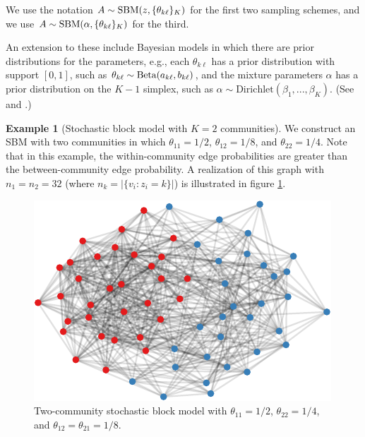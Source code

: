 \documentclass[
  12pt,
]{article}
\theoremstyle{definition}
\theoremstyle{definition}
\newtheorem{example}{Example}[section]
\theoremstyle{definition}
\theoremstyle{definition}
\theoremstyle{remark}
\begin{document}
We use the notation \(A \sim \mathrm{SBM}(z, \{\theta_{k \ell}\}_K)\) for the first two sampling schemes, and we use \(A \sim \mathrm{SBM}(\alpha, \{\theta_{k \ell}\}_K)\) for the third.

An extension to these include Bayesian models in which there are prior distributions for the parameters, e.g., each \(\theta_{k \ell}\) has a prior distribution with support \([0, 1]\), such as \(\theta_{k \ell} \sim \mathrm{Beta}(a_{k \ell}, b_{k \ell})\), and the mixture parameters \(\alpha\) has a prior distribution on the \(K-1\) simplex, such as \(\alpha \sim \mathrm{Dirichlet}(\beta_1, ..., \beta_K)\).
(See \citet{RePEc:eee:csdana:v:60:y:2013:i:c:p:12-31} and \citet{10.2307/43974715}.)

\begin{example}[Stochastic block model with $K = 2$ communities]
\label{ex:assort-sbm}
We construct an SBM with two communities in which $\theta_{11} = 1/2$, $\theta_{12} = 1/8$, and $\theta_{22} = 1/4$. 
Note that in this example, the within-community edge probabilities are greater than the between-community edge probability. 
A realization of this graph with $n_1 = n_2 = 32$ (where $n_k = |\{v_i : z_i = k\}|$) is illustrated in figure \ref{fig:assort-sbm}.

\begin{figure}[H]

{\centering \includegraphics{draft_files/figure-latex/assort-sbm-1} 

}

\caption{Two-community stochastic block model with $\theta_{11}=1/2$, $\theta_{22}=1/4$, and $\theta_{12} = \theta_{21} = 1/8$.}\label{fig:assort-sbm}
\end{figure}
\end{example}
\end{document}
